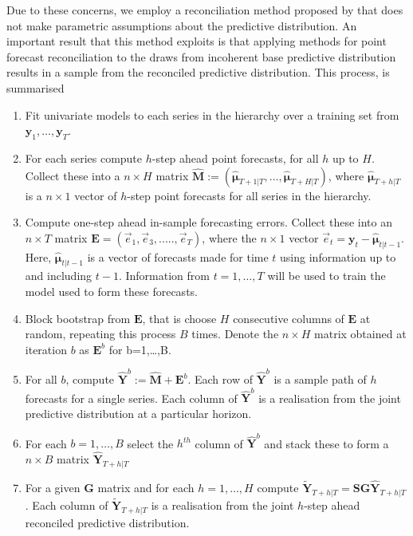 \documentclass[graybox]{svmult}
\begin{document}

Due to these concerns, we employ a reconciliation method proposed by \cite{Gamakumara2018} that does not make parametric assumptions about the predictive distribution.  An important result that this method exploits is that applying methods for point forecast reconciliation to the draws from incoherent base predictive distribution results in a sample from the reconciled predictive distribution. This process, is summarised


\begin{enumerate}
	\item Fit univariate models to each series in the hierarchy over a training set from ${\bm y}_1,\ldots,{\bm y}_T$.
	\item For each series compute $h$-step ahead point forecasts, for all $h$ up to $H$. Collect these into a $n\times H$ matrix $\hat{\bm M}:=(\hat{\bm{\mu}}_{T+1|T},\ldots,\hat{\bm{\mu}}_{T+H|T})$, where $\hat{\bm{\mu}}_{T+h|T}$ is a $n\times 1$ vector of $h$-step point forecasts for all series in the hierarchy.
	\item Compute one-step ahead in-sample forecasting errors. Collect these into an $n \times T$ matrix ${\bm E}=(\vec{e}_1,\vec{e}_3,.....,\vec{e}_T)$, where the $n\times 1$ vector $\vec{e}_t={\bm y}_t-\hat{\bm {\mu}}_{t|t-1}$.  Here, $\hat{\bm {\mu}}_{t|t-1}$ is a vector of forecasts made for time $t$ using information up to and including $t-1$. Information from $t=1,\dots,T$ will be used to train the model used to form these forecasts.
	\item Block bootstrap from $\bm{E}$, that is choose $H$ consecutive columns of ${\bm E}$ at random, repeating this process $B$ times.  Denote the $n\times H$ matrix obtained at iteration $b$ as ${\bm E}^b$ for b=1,\ldots,B.
	\item For all $b$, compute $\hat{\bm Y}^b:=\hat{\bm M}+{\bm E}^b$. Each row of $\hat{\bm Y}^b$ is a sample path of $h$ forecasts for a single series.  Each column of $\hat{\bm Y}^b$ is a realisation from the joint predictive distribution at a particular horizon.
	\item For each $b=1,\ldots,B$ select the $h^{th}$ column of $\hat{\bm Y}^b$ and stack these to form a $n\times B$ matrix $\hat{\bm{Y}}_{T+h|T}$
	\item For a given ${\bm G}$ matrix and for each $h=1,\ldots,H$ compute $\tilde{\bm{Y}}_{T+h|T}={\bm S}{\bm G}\hat{\bm{Y}}_{T+h|T}$.   Each column of $\tilde{\bm Y}_{T+h|T}$ is a realisation from the joint $h$-step ahead reconciled predictive distribution.
\end{enumerate}
\end{document}
